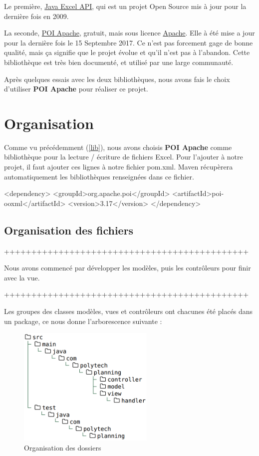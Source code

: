 \documentclass{polytech/polytech}
\begin{document}
	Le première, \href{http://jexcelapi.sourceforge.net/}{Java Excel API}, qui est un projet Open Source mis à jour pour la dernière fois en 2009.

	\label{lib}
	La seconde, \href{http://poi.apache.org}{POI Apache}, gratuit, mais sous licence \href{https://www.apache.org/licenses/}{Apache}.
	Elle à été mise a jour pour la dernière fois le 15 Septembre 2017.
	Ce n'est pas forcement gage de bonne qualité, mais ça signifie que le projet évolue et qu'il n'est pas à l'abandon.
	Cette bibliothèque est très bien documenté, et utilisé par une large communauté.

	Après quelques essais avec les deux bibliothèques, nous avons fais le choix d'utiliser \textbf{POI Apache} pour réaliser ce projet.

	\section{Organisation}

	Comme vu précédemment (\ref{lib}), nous avons choisis \textbf{POI Apache} comme bibliothèque pour la lecture / écriture de fichiers Excel.
	Pour l'ajouter à notre projet, il faut ajouter ces lignes à notre fichier pom.xml.
	Maven récupèrera automatiquement les bibliothèques renseignées dans ce fichier.

	\begin{latexsource}
	<dependency>
		<groupId>org.apache.poi</groupId>
		<artifactId>poi-ooxml</artifactId>
		<version>3.17</version>
	</dependency>
	\end{latexsource}

	\subsection{Organisation des fichiers}
	+++++++++++++++++++++++++++++++++++++++++++++

	Nous avons commencé par développer les modèles, puis les contrôleurs pour finir avec la vue.

	+++++++++++++++++++++++++++++++++++++++++++++

	Les groupes des classes modèles, vues et contrôleurs ont chacunes été placés dans un package, ce nous donne l'arborescence suivante :

	\begin{figure}
		\caption{Organisation des dossiers}
		\includegraphics[width=6.5cm]{./img/folder-planning-w.png}
	\end{figure}
\end{document}
